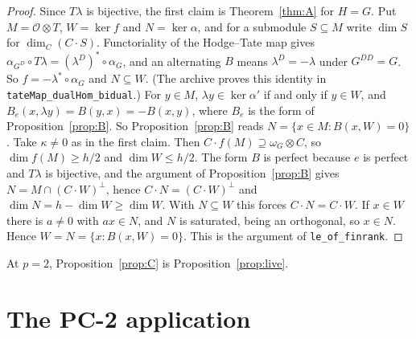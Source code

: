 \documentclass[11pt]{article}
\newcommand{\lean}[1]{\nolinkurl{#1}}
\theoremstyle{definition}
\theoremstyle{remark}
\newcommand{\cO}{\mathcal O}
\begin{document}
\begin{proof}
Since $T\lambda$ is bijective, the first claim is Theorem~\ref{thm:A} for $H=G$. Put $M=\cO\otimes T$, $W=\ker f$ and $N=\ker\alpha$, and for a submodule $S\subseteq M$ write $\dim S$ for $\dim_C(C\cdot S)$. Functoriality of the Hodge--Tate map gives $\alpha_{G^D}\circ T\lambda=(\lambda^D)^*\circ\alpha_G$, and an alternating $B$ means $\lambda^D=-\lambda$ under $G^{DD}=G$. So $f=-\lambda^*\circ\alpha_G$ and $N\subseteq W$. (The archive proves this identity in \lean{tateMap_dualHom_bidual}.) For $y\in M$, $\lambda y\in\ker\alpha'$ if and only if $y\in W$, and $B_e(x,\lambda y)=B(y,x)=-B(x,y)$, where $B_e$ is the form of Proposition~\ref{prop:B}. So Proposition~\ref{prop:B} reads $N=\{x\in M : B(x,W)=0\}$. Take $\kappa\ne0$ as in the first claim. Then $C\cdot f(M)\supseteq\omega_G\otimes C$, so $\dim f(M)\ge h/2$ and $\dim W\le h/2$. The form $B$ is perfect because $e$ is perfect and $T\lambda$ is bijective, and the argument of Proposition~\ref{prop:B} gives $N=M\cap(C\cdot W)^\perp$, hence $C\cdot N=(C\cdot W)^\perp$ and $\dim N=h-\dim W\ge\dim W$. With $N\subseteq W$ this forces $C\cdot N=C\cdot W$. If $x\in W$ there is $a\ne0$ with $ax\in N$, and $N$ is saturated, being an orthogonal, so $x\in N$. Hence $W=N=\{x : B(x,W)=0\}$. This is the argument of \lean{le_of_finrank}.
\end{proof}

At $p=2$, Proposition~\ref{prop:C} is Proposition~\ref{prop:live}.

\section{The PC-2 application}\label{sec:pc2}
\end{document}
